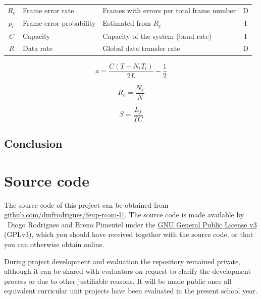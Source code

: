\documentclass[a4paper, 11pt]{report}
\begin{document}
\begin{center}
\begin{tabular}{c | l | p{83mm} | c}
		$R_e$            & Frame error rate          & Frames with errors per total frame number                                          & D   \\
		$p_e$            & Frame error probability   & Estimated from $R_e$                                                               & I   \\
		$C$              & Capacity                  & Capacity of the system (baud rate)                                                 & I   \\
		$R$              & Data rate                 & Global data transfer rate                                                          & D   \\
		\hline \hline
	\end{tabular}
\end{center}

\begin{equation*}
	a = \frac{C(T - N_t T_t)}{2 L} - \frac{1}{2}
\end{equation*}

\begin{equation*}
	R_e = \frac{N_e}{N}
\end{equation*}

\begin{equation*}
	S = \frac{L_f}{T C}
\end{equation*}

\section{Conclusion} \label{sec:Conclusion}

\pagebreak

\appendix
\appendixpage
\addappheadtotoc
\chapter{Source code}

The source code of this project can be obtained from \href{https://github.com/dmfrodrigues/feup-rcom-l1}{github.com/dmfrodrigues/feup-rcom-l1}. The source code is made available by \textcopyright~Diogo Rodrigues and Breno Pimentel under the \href{https://www.gnu.org/licenses/gpl-3.0.en.html}{GNU General Public License v3} (GPLv3), which you should have received together with the source code, or that you can otherwise obtain online.

During project development and evaluation the repository remained private, although it can be shared with evaluators on request to clarify the development process or due to other justifiable reasons. It will be made public once all equivalent curricular unit projects have been evaluated in the present school year.
\end{document}
